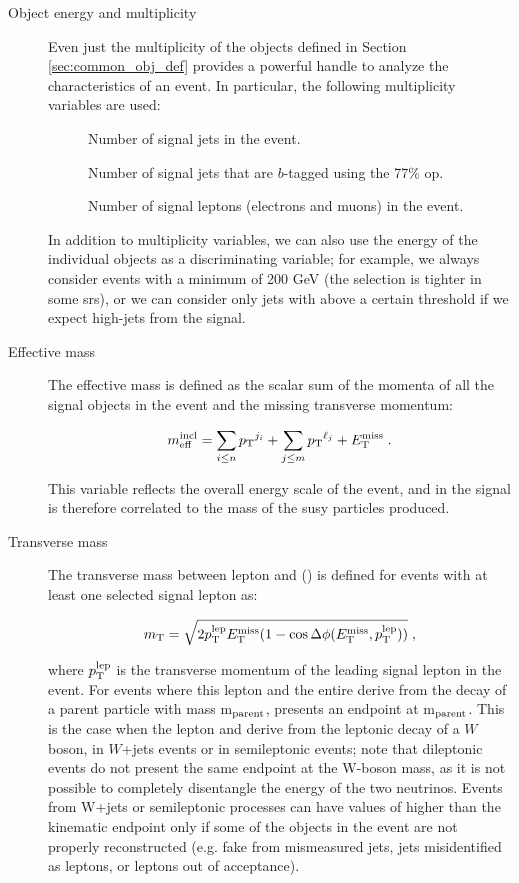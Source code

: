 \begin{description}
\item[Object energy and multiplicity] Even just the multiplicity of the objects defined in Section \ref{sec:common_obj_def} provides a powerful handle to analyze the characteristics of an event. In particular, the following multiplicity variables are used:

\begin{description}
\item[\njet] Number of signal jets in the event.
\item[\nbjet] Number of signal jets that are $b$-tagged using the 77\% \gls{op}.
\item[\nlep] Number of signal leptons (electrons and muons) in the event.
\end{description}

\noindent In addition to multiplicity variables, we can also use the energy of the individual objects as a discriminating variable; 
for example, we always consider events with a minimum \met of 200 GeV (the selection is tighter in some \glspl{sr}), 
or we can consider only jets with \pt above a certain threshold if we expect high-\pt jets from the signal. 

\item[Effective mass] The effective mass is defined as the scalar sum of the momenta of all the signal objects in the event and the missing transverse momentum:

\begin{equation}
m_{\mathrm{eff}}^{\mathrm{incl}} = \sum_{i\leq n} {p_{\rm T}}^{j_i}  + \sum_{j\leq m} {p_{\rm T}}^{\ell_j}  + E_{\rm T}^{\mathrm{miss}} \; . \nonumber
\end{equation}

\noindent This variable reflects the overall energy scale of the event, and in the signal is therefore correlated to the mass of the \gls{susy} particles produced. 

\item[Transverse mass] The transverse mass between lepton and \met (\mt) is defined for events with at least one selected signal lepton as: 

\begin{equation}
m_\mathrm{T} = \sqrt{2p_{\rm T}^{\rm{lep}}E_{\rm T}^{\mathrm{miss}}(1-\cos\Delta\phi(E_{\rm T}^{\mathrm{miss}},p_{\rm T}^{\rm{lep}}))} \; , \nonumber
\end{equation}

\noindent where $p_{\rm T}^{\rm{lep}}$ is the transverse momentum of the leading signal lepton in the event. 
For events where this lepton and the entire \met derive from the decay of a parent particle with mass m$_{\rm{parent}}$, \mt presents an endpoint at m$_{\rm{parent}}$. 
This is the case when the lepton and \met derive from the leptonic decay of a $W$ boson, in $W$+jets events or in semileptonic \ttbar events; 
note that dileptonic \ttbar events do not present the same endpoint at the W-boson mass, as it is not possible to completely disentangle the energy of the two neutrinos. Events from W+jets or semileptonic \ttbar processes can have values of \mt higher than the kinematic endpoint only if some of the objects in the event are not properly reconstructed (e.g. fake \met from mismeasured jets, jets misidentified as leptons, or leptons out of acceptance).


\end{description}
